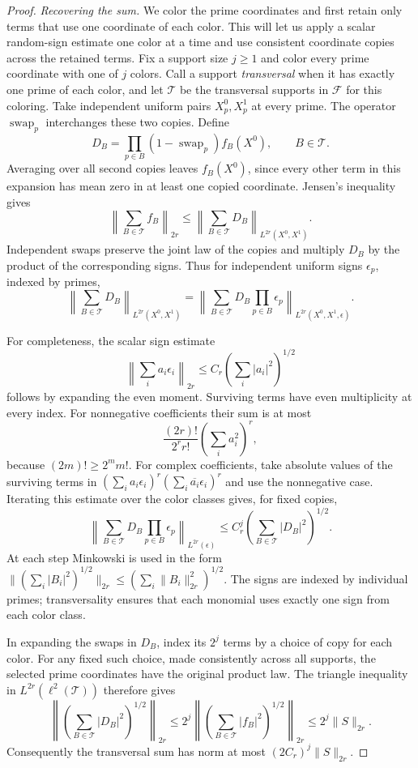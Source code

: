 \begin{proof}
\smallskip
\noindent\emph{Recovering the sum.}
We color the prime coordinates and first retain only terms that use one
coordinate of each color.  This will let us apply a scalar random-sign
estimate one color at a time and use consistent coordinate copies across
the retained terms.  Fix a support size \(j\ge1\) and color every prime coordinate with one
of \(j\) colors.  Call a support \emph{transversal} when it has exactly
one prime of each color, and let \(\mathcal T\) be the transversal
supports in \(\mathcal F\) for this coloring.  Take independent uniform
pairs \(X_p^0,X_p^1\) at every prime.  The operator
\(\operatorname{swap}_p\) interchanges these two copies.  Define
\[
 D_B=\prod_{p\in B}(1-\operatorname{swap}_p)f_B(X^0),
 \qquad B\in\mathcal T.
\]
Averaging over all second copies leaves \(f_B(X^0)\), since every
other term in this expansion has mean zero in at least one copied
coordinate.  Jensen's inequality gives
\[
 \left\|\sum_{B\in\mathcal T}f_B\right\|_{2r}
 \le\left\|\sum_{B\in\mathcal T}D_B\right\|_{L^{2r}(X^0,X^1)}.
\]
Independent swaps preserve the joint law of the copies and multiply
\(D_B\) by the product of the corresponding signs.  Thus for independent
uniform signs \(\epsilon_p\), indexed by primes,
\[
 \left\|\sum_{B\in\mathcal T}D_B\right\|_{L^{2r}(X^0,X^1)}
 =\left\|\sum_{B\in\mathcal T}D_B\prod_{p\in B}\epsilon_p
       \right\|_{L^{2r}(X^0,X^1,\epsilon)}.
\]

For completeness, the scalar sign estimate
\[
 \left\|\sum_i a_i\epsilon_i\right\|_{2r}
 \le C_r\left(\sum_i|a_i|^2\right)^{1/2}
\]
follows by expanding the even moment.  Surviving terms have even
multiplicity at every index.  For nonnegative coefficients their sum is
at most
\[
 \frac{(2r)!}{2^r r!}\left(\sum_i a_i^2\right)^r,
\]
because \((2m)!\ge2^m m!\).  For complex coefficients, take absolute
values of the surviving terms in
\((\sum_i a_i\epsilon_i)^r(\sum_i\overline{a_i}\epsilon_i)^r\)
and use the nonnegative case.  Iterating this estimate over the color
classes gives, for fixed copies,
\[
 \left\|\sum_{B\in\mathcal T}D_B\prod_{p\in B}\epsilon_p
       \right\|_{L^{2r}(\epsilon)}
 \le C_r^j\left(\sum_{B\in\mathcal T}|D_B|^2\right)^{1/2}.
\]
At each step Minkowski is used in the form
\(\| (\sum_i|B_i|^2)^{1/2}\|_{2r}
\le(\sum_i\|B_i\|_{2r}^2)^{1/2}\).
The signs are indexed by individual primes; transversality ensures that
each monomial uses exactly one sign from each color class.

In expanding the swaps in \(D_B\), index its \(2^j\) terms by a choice
of copy for each color.  For any fixed such choice, made consistently
across all supports, the selected prime coordinates have the original
product law.  The triangle inequality in
\(L^{2r}(\ell^2(\mathcal T))\) therefore gives
\[
 \left\|\left(\sum_{B\in\mathcal T}|D_B|^2\right)^{1/2}\right\|_{2r}
 \le2^j\left\|\left(\sum_{B\in\mathcal T}|f_B|^2\right)^{1/2}
       \right\|_{2r}
 \le2^j\|S\|_{2r}.
\]
Consequently the transversal sum has norm at most
\((2C_r)^j\|S\|_{2r}\).


\end{proof}
